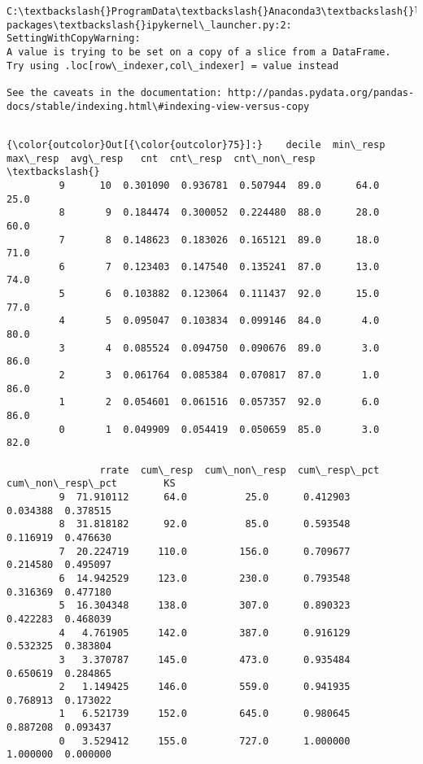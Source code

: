 \documentclass[11pt]{article}
\begin{document}
    \begin{Verbatim}[commandchars=\\\{\}]
C:\textbackslash{}ProgramData\textbackslash{}Anaconda3\textbackslash{}lib\textbackslash{}site-packages\textbackslash{}ipykernel\_launcher.py:2: SettingWithCopyWarning: 
A value is trying to be set on a copy of a slice from a DataFrame.
Try using .loc[row\_indexer,col\_indexer] = value instead

See the caveats in the documentation: http://pandas.pydata.org/pandas-docs/stable/indexing.html\#indexing-view-versus-copy
  

    \end{Verbatim}

\begin{Verbatim}[commandchars=\\\{\}]
{\color{outcolor}Out[{\color{outcolor}75}]:}    decile  min\_resp  max\_resp  avg\_resp   cnt  cnt\_resp  cnt\_non\_resp  \textbackslash{}
         9      10  0.301090  0.936781  0.507944  89.0      64.0          25.0   
         8       9  0.184474  0.300052  0.224480  88.0      28.0          60.0   
         7       8  0.148623  0.183026  0.165121  89.0      18.0          71.0   
         6       7  0.123403  0.147540  0.135241  87.0      13.0          74.0   
         5       6  0.103882  0.123064  0.111437  92.0      15.0          77.0   
         4       5  0.095047  0.103834  0.099146  84.0       4.0          80.0   
         3       4  0.085524  0.094750  0.090676  89.0       3.0          86.0   
         2       3  0.061764  0.085384  0.070817  87.0       1.0          86.0   
         1       2  0.054601  0.061516  0.057357  92.0       6.0          86.0   
         0       1  0.049909  0.054419  0.050659  85.0       3.0          82.0   
         
                rrate  cum\_resp  cum\_non\_resp  cum\_resp\_pct  cum\_non\_resp\_pct        KS  
         9  71.910112      64.0          25.0      0.412903          0.034388  0.378515  
         8  31.818182      92.0          85.0      0.593548          0.116919  0.476630  
         7  20.224719     110.0         156.0      0.709677          0.214580  0.495097  
         6  14.942529     123.0         230.0      0.793548          0.316369  0.477180  
         5  16.304348     138.0         307.0      0.890323          0.422283  0.468039  
         4   4.761905     142.0         387.0      0.916129          0.532325  0.383804  
         3   3.370787     145.0         473.0      0.935484          0.650619  0.284865  
         2   1.149425     146.0         559.0      0.941935          0.768913  0.173022  
         1   6.521739     152.0         645.0      0.980645          0.887208  0.093437  
         0   3.529412     155.0         727.0      1.000000          1.000000  0.000000  
\end{Verbatim}
            
\end{document}
